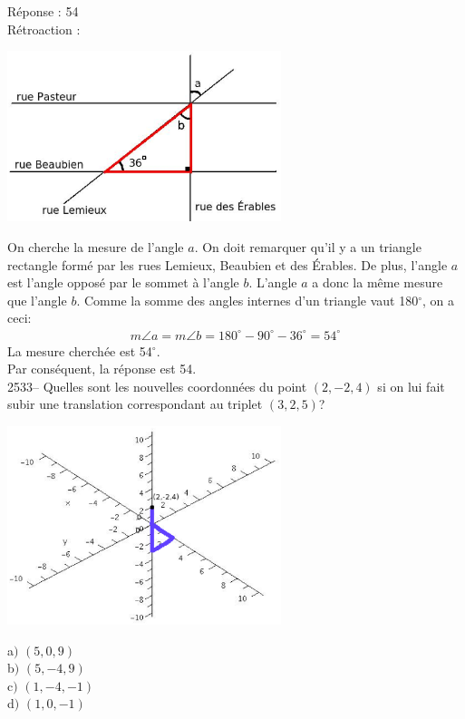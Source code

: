 \documentclass[letterpaper, 12pt]{article}
\begin{document}
R\'eponse : 54\\

R\'etroaction :\\
\begin{center}
 \includegraphics[width=8cm,bb=14 14 606 383]{Q2532r.eps}
\end{center}
On cherche la mesure de l'angle $a$. On doit remarquer qu'il y a un triangle rectangle form\'e par les rues Lemieux, Beaubien et des \'Erables. De plus, l'angle $a$ est l'angle oppos\'e par le sommet \`a l'angle $b$. L'angle $a$ a donc la m\^eme mesure que l'angle $b$. Comme la somme des angles internes d'un triangle vaut 180$^{\circ}$, on a ceci:
\begin{eqnarray*}
 m\angle{a}=m\angle{b}=180^{\circ}-90^{\circ}-36^{\circ}=54^{\circ}
\end{eqnarray*}
La mesure cherch\'ee est 54$^{\circ}$. \\
Par cons\'equent, la r\'eponse est 54.\\

2533-- Quelles sont les nouvelles coordonn\'ees du point $(2, -2, 4)$ si on lui fait subir une translation correspondant au triplet $(3, 2, 5)$? \\
\begin{center}
 \includegraphics[width=8cm,bb=14 14 594 444]{Q2533q.eps}
\end{center}
a$)$ $(5, 0, 9)$\\
b$)$ $(5, -4, 9)$\\
c$)$ $(1, -4, -1)$\\
d$)$ $(1, 0, -1)$\\
\end{document}
